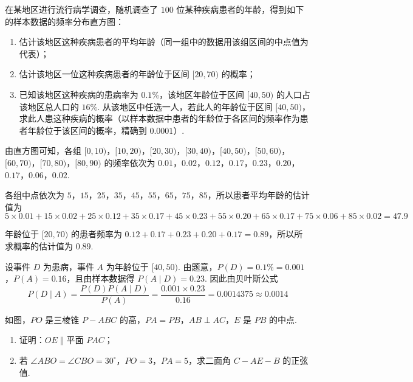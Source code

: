 \begin{problem}
在某地区进行流行病学调查，随机调查了 \(100\) 位某种疾病患者的年龄，得到如下的样本数据的频率分布直方图：

\begin{enumerate}
\item 估计该地区这种疾病患者的平均年龄（同一组中的数据用该组区间的中点值为代表）；
\item 估计该地区一位这种疾病患者的年龄位于区间 \([20,70)\) 的概率；
\item 已知该地区这种疾病的患病率为 \(0.1\%\)，该地区年龄位于区间 \([40,50)\) 的人口占该地区总人口的 \(16\%\). 从该地区中任选一人，若此人的年龄位于区间 \([40,50)\)，求此人患这种疾病的概率（以样本数据中患者的年龄位于各区间的频率作为患者年龄位于该区间的概率，精确到 \(0.0001\)）.
\end{enumerate}

\end{problem}

\begin{solution}
由直方图可知，各组 \([0,10)\)，\([10,20)\)，\([20,30)\)，\([30,40)\)，\([40,50)\)，\([50,60)\)，\([60,70)\)，\([70,80)\)，\([80,90)\) 的频率依次为
\(0.01\)，\(0.02\)，\(0.12\)，\(0.17\)，\(0.23\)，\(0.20\)，\(0.17\)，\(0.06\)，\(0.02\).

各组中点依次为 \(5\)，\(15\)，\(25\)，\(35\)，\(45\)，\(55\)，\(65\)，\(75\)，\(85\)，所以患者平均年龄的估计值为
\[
5\times0.01+15\times0.02+25\times0.12+35\times0.17+45\times0.23+55\times0.20+65\times0.17+75\times0.06+85\times0.02=47.9
\]

年龄位于 \([20,70)\) 的患者频率为
\(0.12+0.17+0.23+0.20+0.17=0.89\)，所以所求概率的估计值为 \(0.89\).

设事件 \(D\) 为患病，事件 \(A\) 为年龄位于 \([40,50)\). 由题意，\(P(D)=0.1\%=0.001\)，\(P(A)=0.16\)，且由样本数据得 \(P(A\mid D)=0.23\). 因此由贝叶斯公式
\[
P(D\mid A)=\frac{P(D)P(A\mid D)}{P(A)}=\frac{0.001\times0.23}{0.16}=0.0014375\approx0.0014
\]
\end{solution}


\begin{problem}
如图，\(PO\) 是三棱锥 \(P-ABC\) 的高，\(PA=PB\)，\(AB\perp AC\)，\(E\) 是 \(PB\) 的中点.

\begin{enumerate}
\item 证明：\(OE\parallel\text{平面 }PAC\)；
\item 若 \(\angle ABO=\angle CBO=30^\circ\)，\(PO=3\)，\(PA=5\)，求二面角 \(C-AE-B\) 的正弦值.
\end{enumerate}

\end{problem}

